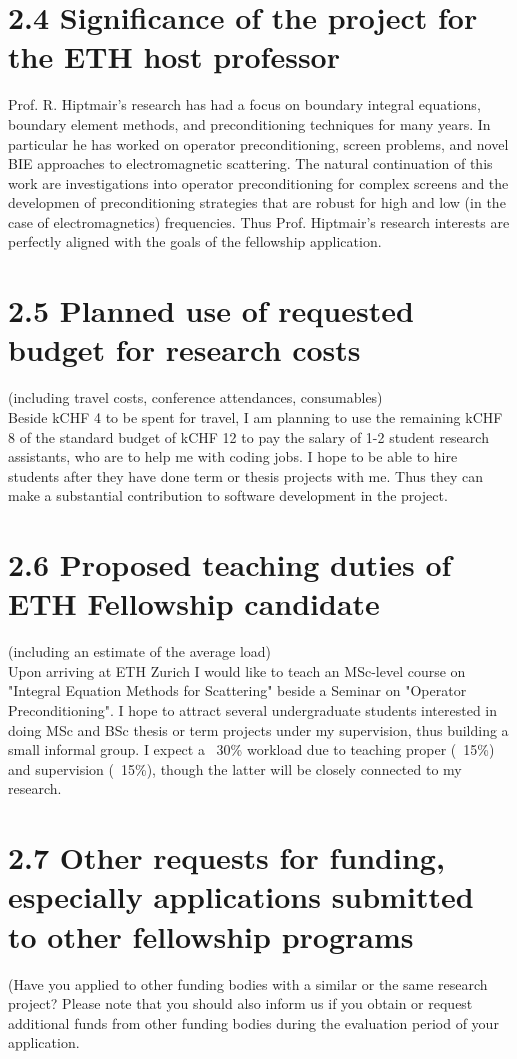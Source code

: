 \documentclass[]{report}
\begin{document}
\section*{2.4 Significance of the project for the ETH host professor} 

Prof. R. Hiptmair's research has had a focus on boundary integral equations, boundary element methods, and preconditioning techniques for many years. In particular he has worked on operator preconditioning, screen problems, and novel BIE approaches to electromagnetic scattering. The natural continuation of this work are investigations into operator preconditioning for complex screens and the developmen of preconditioning strategies that are robust for high and low (in the case of electromagnetics) frequencies. Thus Prof. Hiptmair's research interests are perfectly aligned with the goals of the fellowship application.


\section*{2.5 Planned use of requested budget for research costs }
(including travel costs, conference attendances, consumables)\\

Beside kCHF 4 to be spent for travel, I am planning to use the remaining kCHF 8 of the standard budget of kCHF 12 to pay the salary of 1-2 student research assistants, who are to help me with coding jobs. I hope to be able to hire students after they have done term or thesis projects with me. Thus they can make a substantial contribution to software development in the project.

\section*{2.6 Proposed teaching duties of ETH Fellowship candidate}
(including an estimate of the average load)\\

Upon arriving at ETH Zurich I would like to teach an MSc-level course on "Integral
Equation Methods for Scattering" beside a Seminar on "Operator Preconditioning". I hope to attract several undergraduate students interested in doing MSc and BSc thesis or term projects under my supervision, thus building a small informal group. I expect a ~30\% workload due to teaching proper (~15\%) and supervision (~15\%), though the latter will be closely connected to my research.

\section*{2.7 Other requests for funding, especially applications submitted to other fellowship programs}
	(Have you applied to other funding bodies with a similar or the same research project? Please note that you should also inform us if you obtain or request additional funds from other funding bodies during the evaluation period of your application.\\
	
\end{document}

